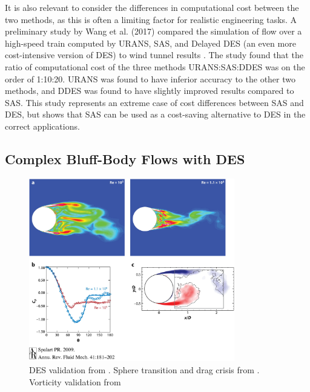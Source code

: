 \documentclass[journal]{new-aiaa}
\begin{document}
It is also relevant to consider the differences in computational cost between the two methods, as this is often a limiting factor for realistic engineering tasks. A preliminary study by Wang et al. (2017) compared the simulation of flow over a high-speed train computed by URANS, SAS, and Delayed DES (an even more cost-intensive version of DES) to wind tunnel results \cite{wang2017performance}. The study found that the ratio of computational cost of the three methods URANS:SAS:DDES was on the order of 1:10:20. URANS was found to have inferior accuracy to the other two methods, and DDES was found to have slightly improved results compared to SAS. This study represents an extreme case of cost differences between SAS and DES, but shows that SAS can be used as a cost-saving alternative to DES in the correct applications.
















\subsection{Complex Bluff-Body Flows with DES} \label{subsec:complexdes}


\begin{figure}[H]
\begin{center}
\includegraphics[width=0.8\textwidth]{Images/logan/spalart2009detachededdy_SphereSeparation.jpeg}
\caption{ DES validation from \cite{spalart2009detachededdy}. Sphere transition and drag crisis from \cite{squires2004detachededdy}.  Vorticity validation from \cite{mockett2008demonstration} }
\label{fig:desspherevalidation}
\end{center}
\end{figure}
\end{document}
